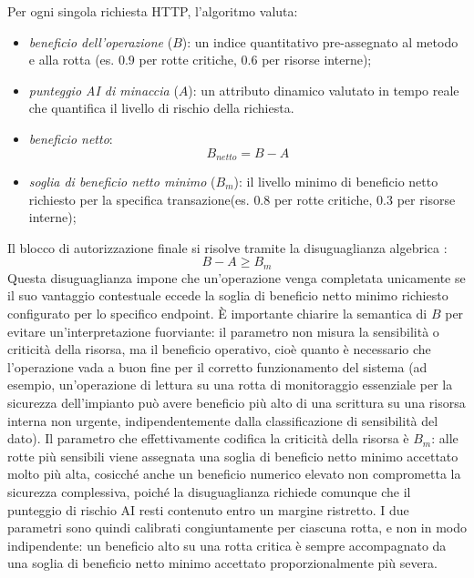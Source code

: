 Per ogni singola richiesta HTTP, l'algoritmo valuta:
\begin{itemize}
    \item \textit{beneficio dell'operazione} ($B$): un indice quantitativo pre-assegnato al metodo e alla rotta (es. $0.9$ per rotte critiche, $0.6$ per risorse interne);
    \item \textit{punteggio AI di minaccia} ($A$): un attributo dinamico valutato in tempo reale che quantifica il livello di rischio della richiesta.
    \item \textit{beneficio netto}: \begin{equation}
    B_{netto} =  B - A \end{equation}
    \item \textit{soglia di beneficio netto minimo} ($B_{m}$): il livello minimo di beneficio netto richiesto per la specifica transazione(es. $0.8$ per rotte critiche, $0.3$ per risorse interne);
\end{itemize}

Il blocco di autorizzazione finale si risolve tramite la disuguaglianza algebrica :
\begin{equation}
    B - A \geq B_{m}
\end{equation}
Questa disuguaglianza impone che un'operazione venga completata unicamente se il suo vantaggio contestuale eccede la soglia di beneficio netto minimo richiesto configurato per lo specifico endpoint. È importante chiarire la semantica di $B$ per evitare un'interpretazione fuorviante: il parametro non misura la sensibilità o criticità della risorsa, ma il beneficio operativo, cioè quanto è necessario che l'operazione vada a buon fine per il corretto funzionamento del sistema (ad esempio, un'operazione di lettura su una rotta di monitoraggio essenziale per la sicurezza dell'impianto può avere beneficio più alto di una scrittura su una risorsa interna non urgente, indipendentemente dalla classificazione di sensibilità del dato). Il parametro che effettivamente codifica la criticità della risorsa è $B_{m}$: alle rotte più sensibili viene assegnata una soglia di beneficio netto minimo accettato molto più alta, cosicché anche un beneficio numerico elevato non comprometta la sicurezza complessiva, poiché la disuguaglianza richiede comunque che il punteggio di rischio AI resti contenuto entro un margine ristretto. I due parametri sono quindi calibrati congiuntamente per ciascuna rotta, e non in modo indipendente: un beneficio alto su una rotta critica è sempre accompagnato da una soglia di beneficio netto minimo accettato proporzionalmente più severa.


